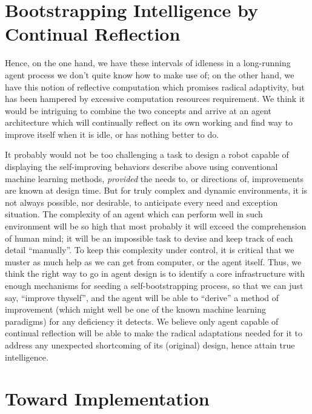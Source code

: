\documentclass{llncs}
\begin{document}
\section{Bootstrapping Intelligence by Continual Reflection\label{bootstrap}}

Hence, on the one hand, we have these intervals of idleness in a
long-running agent process we don't quite know how to make use of; on the
other hand, we have this notion of reflective computation which promises
radical adaptivity, but has been hampered by excessive computation
resources requirement.  We think it would be intriguing to combine the two
concepts and arrive at an agent architecture which will continually reflect
on its own working and find way to improve itself when it is idle, or has
nothing better to do.

It probably would not be too challenging a task to design a robot capable
of displaying the self-improving behaviors describe above using
conventional machine learning methods, \emph{provided} the needs to, or
directions of, improvements are known at design time.  But for truly
complex and dynamic environments, it is not always possible, nor desirable,
to anticipate every need and exception situation.  The complexity of an
agent which can perform well in such environment will be so high that most
probably it will exceed the comprehension of human mind; it will be an
impossible task to devise and keep track of each detail ``manually''.  To
keep this complexity under control, it is critical that we muster as much
help as we can get from computer, or the agent itself.  Thus, we think the
right way to go in agent design is to identify a core infrastructure with
enough mechanisms for seeding a self-bootstrapping process, so that we can
just say, ``improve thyself'', and the agent will be able to ``derive'' a
method of improvement (which might well be one of the known machine
learning paradigms) for any deficiency it detects.  We believe only agent
capable of continual reflection will be able to make the radical
adaptations needed for it to address any unexpected shortcoming of its
(original) design, hence attain true intelligence.



\section{Toward Implementation\label{activelogic}}
\end{document}
